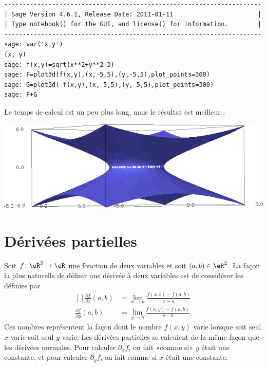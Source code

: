 \begin{example}
    \begin{verbatim}
----------------------------------------------------------------------
| Sage Version 4.6.1, Release Date: 2011-01-11                       |
| Type notebook() for the GUI, and license() for information.        |
----------------------------------------------------------------------
sage: var('x,y')
(x, y)
sage: f(x,y)=sqrt(x**2+y**2-3)
sage: F=plot3d(f(x,y),(x,-5,5),(y,-5,5),plot_points=300) 
sage: G=plot3d(-f(x,y),(x,-5,5),(y,-5,5),plot_points=300)
sage: F+G
    \end{verbatim}
    Le temps de calcul est un peu plus long, mais le résultat est meilleur :
    \begin{center}
            \includegraphics[width=15cm]{pictures_bitmap/AdSbon.png}
    \end{center}
\end{example}

\section{Dérivées partielles}

Soit $f\colon \eR^2\to \eR$ une fonction de deux variables et soit $(a,b)\in\eR^2$. La façon la plus naturelle de définir une dérivée à deux variables est de considérer les  définies par
\begin{equation}
    \begin{aligned}[]
        \frac{ \partial f }{ \partial x }(a,b)&=\lim_{x\to a} \frac{ f(x,b)-f(a,b) }{ x-a }\\
        \frac{ \partial f }{ \partial y }(a,b)&=\lim_{y\to b} \frac{ f(a,y)-f(a,b) }{y-b}.
    \end{aligned}
\end{equation}
Ces nombres représentent la façon dont le nombre $f(x,y)$ varie lorsque soit seul $x$ varie soit seul $y$ varie. Les dérivées partielles se calculent de la même façon que les dérivées normales. Pour calculer $\partial_xf$, on fait «comme si» $y$ était une constante, et pour calculer $\partial_yf$, on fait comme si $x$ était une constante.

